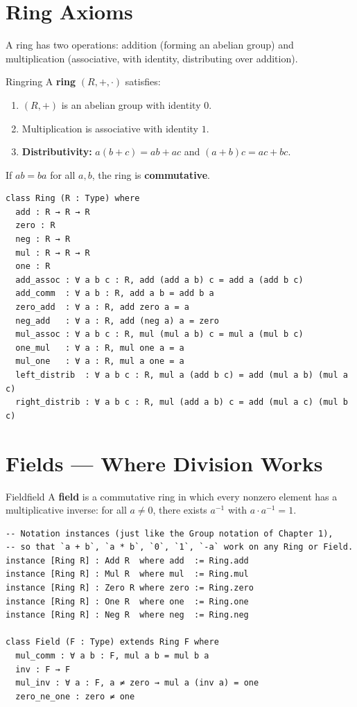 \documentclass[11pt, a4paper, oneside]{book}
\begin{document}
\section{Ring Axioms}

A ring has two operations: addition (forming an abelian group) and
multiplication (associative, with identity, distributing over addition).

\begin{defn}{Ring}{ring}
A \textbf{ring} $(R, +, \cdot)$ satisfies:
\begin{enumerate}[nosep, label=(\roman*)]
\item $(R, +)$ is an abelian group with identity $0$.
\item Multiplication is associative with identity $1$.
\item \textbf{Distributivity:} $a(b + c) = ab + ac$ and $(a + b)c = ac + bc$.
\end{enumerate}
If $ab = ba$ for all $a, b$, the ring is \textbf{commutative}.
\end{defn}

\begin{leanbox}
\begin{verbatim}
class Ring (R : Type) where
  add : R → R → R
  zero : R
  neg : R → R
  mul : R → R → R
  one : R
  add_assoc : ∀ a b c : R, add (add a b) c = add a (add b c)
  add_comm  : ∀ a b : R, add a b = add b a
  zero_add  : ∀ a : R, add zero a = a
  neg_add   : ∀ a : R, add (neg a) a = zero
  mul_assoc : ∀ a b c : R, mul (mul a b) c = mul a (mul b c)
  one_mul   : ∀ a : R, mul one a = a
  mul_one   : ∀ a : R, mul a one = a
  left_distrib  : ∀ a b c : R, mul a (add b c) = add (mul a b) (mul a c)
  right_distrib : ∀ a b c : R, mul (add a b) c = add (mul a c) (mul b c)
\end{verbatim}
\end{leanbox}

\section{Fields --- Where Division Works}

\begin{defn}{Field}{field}
A \textbf{field} is a commutative ring in which every nonzero element has a
multiplicative inverse: for all $a \neq 0$, there exists $a^{-1}$ with
$a \cdot a^{-1} = 1$.
\end{defn}

\begin{leanbox}
\begin{verbatim}
-- Notation instances (just like the Group notation of Chapter 1),
-- so that `a + b`, `a * b`, `0`, `1`, `-a` work on any Ring or Field.
instance [Ring R] : Add R  where add  := Ring.add
instance [Ring R] : Mul R  where mul  := Ring.mul
instance [Ring R] : Zero R where zero := Ring.zero
instance [Ring R] : One R  where one  := Ring.one
instance [Ring R] : Neg R  where neg  := Ring.neg

class Field (F : Type) extends Ring F where
  mul_comm : ∀ a b : F, mul a b = mul b a
  inv : F → F
  mul_inv : ∀ a : F, a ≠ zero → mul a (inv a) = one
  zero_ne_one : zero ≠ one
\end{verbatim}
\end{leanbox}
\end{document}
